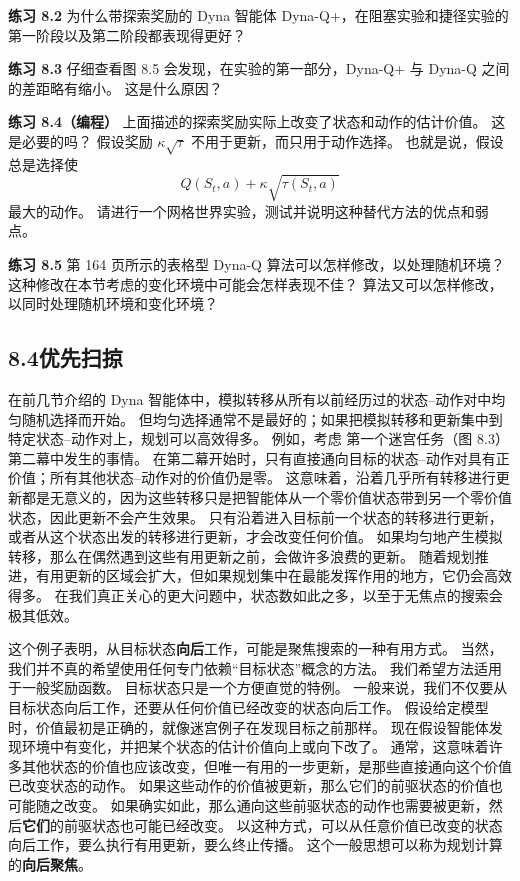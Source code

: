 \documentclass[UTF8,12pt,a4paper,fontset=fandol]{ctexart}
\begin{document}
\noindent\textbf{练习 8.2}
为什么带探索奖励的 Dyna 智能体 Dyna-Q+，在阻塞实验和捷径实验的第一阶段以及第二阶段都表现得更好？

\noindent\textbf{练习 8.3}
仔细查看图 8.5 会发现，在实验的第一部分，Dyna-Q+ 与 Dyna-Q 之间的差距略有缩小。
这是什么原因？

\noindent\textbf{练习 8.4（编程）}
上面描述的探索奖励实际上改变了状态和动作的估计价值。
这是必要的吗？
假设奖励 $\kappa\sqrt{\tau}$ 不用于更新，而只用于动作选择。
也就是说，假设总是选择使
\[
Q(S_t,a)+\kappa\sqrt{\tau(S_t,a)}
\]
最大的动作。
请进行一个网格世界实验，测试并说明这种替代方法的优点和弱点。

\noindent\textbf{练习 8.5}
第 164 页所示的表格型 Dyna-Q 算法可以怎样修改，以处理随机环境？
这种修改在本节考虑的变化环境中可能会怎样表现不佳？
算法又可以怎样修改，以同时处理随机环境和变化环境？

\subsection*{8.4\quad 优先扫掠}

在前几节介绍的 Dyna 智能体中，模拟转移从所有以前经历过的状态--动作对中均匀随机选择而开始。
但均匀选择通常不是最好的；如果把模拟转移和更新集中到特定状态--动作对上，规划可以高效得多。
例如，考虑
第一个迷宫任务（图 8.3）第二幕中发生的事情。
在第二幕开始时，只有直接通向目标的状态--动作对具有正价值；所有其他状态--动作对的价值仍是零。
这意味着，沿着几乎所有转移进行更新都是无意义的，因为这些转移只是把智能体从一个零价值状态带到另一个零价值状态，因此更新不会产生效果。
只有沿着进入目标前一个状态的转移进行更新，或者从这个状态出发的转移进行更新，才会改变任何价值。
如果均匀地产生模拟转移，那么在偶然遇到这些有用更新之前，会做许多浪费的更新。
随着规划推进，有用更新的区域会扩大，但如果规划集中在最能发挥作用的地方，它仍会高效得多。
在我们真正关心的更大问题中，状态数如此之多，以至于无焦点的搜索会极其低效。

这个例子表明，从目标状态\textbf{向后}工作，可能是聚焦搜索的一种有用方式。
当然，我们并不真的希望使用任何专门依赖“目标状态”概念的方法。
我们希望方法适用于一般奖励函数。
目标状态只是一个方便直觉的特例。
一般来说，我们不仅要从目标状态向后工作，还要从任何价值已经改变的状态向后工作。
假设给定模型时，价值最初是正确的，就像迷宫例子在发现目标之前那样。
现在假设智能体发现环境中有变化，并把某个状态的估计价值向上或向下改了。
通常，这意味着许多其他状态的价值也应该改变，但唯一有用的一步更新，是那些直接通向这个价值已改变状态的动作。
如果这些动作的价值被更新，那么它们的前驱状态的价值也可能随之改变。
如果确实如此，那么通向这些前驱状态的动作也需要被更新，然后\textbf{它们}的前驱状态也可能已经改变。
以这种方式，可以从任意价值已改变的状态向后工作，要么执行有用更新，要么终止传播。
这个一般思想可以称为规划计算的\textbf{向后聚焦}。
\end{document}
